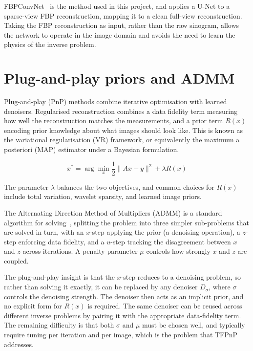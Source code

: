 FBPConvNet~\citep{Jin2017FBPConvNet} is the method used in this project, and applies a U-Net to a sparse-view FBP reconstruction, mapping it to a clean full-view reconstruction. Taking the FBP reconstruction as input, rather than the raw sinogram, allows the network to operate in the image domain and avoids the need to learn
the physics of the inverse problem.

\section{Plug-and-play priors and ADMM}
\label{sec:pnp-admm}

Plug-and-play (PnP) methods combine iterative optimisation with learned denoisers. Regularised reconstruction combines a data fidelity term measuring how well the reconstruction matches the measurements, and a prior term $R(x)$ encoding prior knowledge about what images should look like. This is known as the variational regularisation (VR) framework, or equivalently the maximum a posteriori (MAP) estimator under a Bayesian formulation.

\begin{equation}
    x^* = \arg\min_x \frac{1}{2}\|Ax - y\|^2 + \lambda R(x)
    \label{eq:regularised_recon}
\end{equation}

The parameter $\lambda$ balances the two objectives, and common choices for $R(x)$ include total variation, wavelet sparsity, and learned image priors.

The Alternating Direction Method of Multipliers (ADMM) is a standard algorithm for solving~, splitting the problem into three simpler sub-problems that are solved in turn, with an $x$-step applying the prior (a denoising operation), a $z$-step enforcing data fidelity, and a $u$-step tracking the disagreement between $x$ and $z$ across iterations. A penalty parameter $\mu$ controls how strongly $x$ and $z$ are coupled.

The plug-and-play insight is that the $x$-step reduces to a denoising problem, so rather than solving it exactly, it can be replaced by any denoiser $D_\sigma$, where $\sigma$ controls the denoising strength. The denoiser then acts as an implicit prior, and no explicit form for $R(x)$ is required. The same denoiser can be reused across different inverse problems by pairing it with the appropriate data-fidelity term. The remaining difficulty is that both $\sigma$ and $\mu$ must be chosen well, and typically require tuning per iteration and per image, which is the problem that TFPnP addresses.

